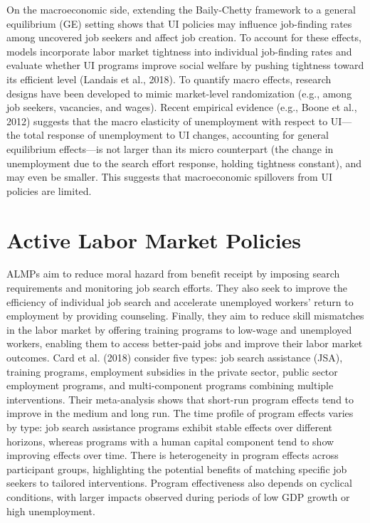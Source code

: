 \documentclass{article}
\begin{document}
On the macroeconomic side, extending the Baily-Chetty framework to a general equilibrium (GE) setting shows that UI policies may influence job-finding rates among uncovered job seekers and affect job creation. To account for these effects, models incorporate labor market tightness into individual job-finding rates and evaluate whether UI programs improve social welfare by pushing tightness toward its efficient level (Landais et al., 2018). To quantify macro effects, research designs have been developed to mimic market-level randomization (e.g., among job seekers, vacancies, and wages). Recent empirical evidence (e.g., Boone et al., 2012) suggests that the macro elasticity of unemployment with respect to UI—the total response of unemployment to UI changes, accounting for general equilibrium effects—is not larger than its micro counterpart (the change in unemployment due to the search effort response, holding tightness constant), and may even be smaller. This suggests that macroeconomic spillovers from UI policies are limited.

\section{Active Labor Market Policies}

ALMPs aim to reduce moral hazard from benefit receipt by imposing search requirements and monitoring job search efforts. They also seek to improve the efficiency of individual job search and accelerate unemployed workers' return to employment by providing counseling. Finally, they aim to reduce skill mismatches in the labor market by offering training programs to low-wage and unemployed workers, enabling them to access better-paid jobs and improve their labor market outcomes. Card et al. (2018) consider five types: job search assistance (JSA), training programs, employment subsidies in the private sector, public sector employment programs, and multi-component programs combining multiple interventions. Their meta-analysis shows that short-run program effects tend to improve in the medium and long run. The time profile of program effects varies by type: job search assistance programs exhibit stable effects over different horizons, whereas programs with a human capital component tend to show improving effects over time. There is heterogeneity in program effects across participant groups, highlighting the potential benefits of matching specific job seekers to tailored interventions. Program effectiveness also depends on cyclical conditions, with larger impacts observed during periods of low GDP growth or high unemployment.
\end{document}
